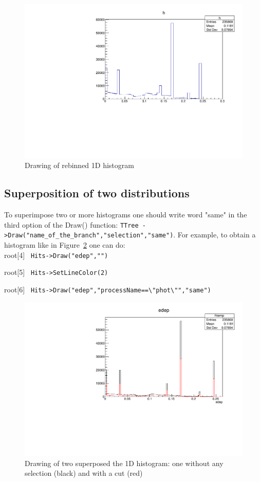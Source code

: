 \documentclass[12pt]{article}
\begin{document}
\begin{figure}[h]
\centering
\includegraphics[scale=0.5]{figs/1Drebinning.pdf}
\caption{Drawing of rebinned 1D histogram}
\label{fig:rebin}
\end{figure}

\clearpage
\subsection{Superposition of two distributions}
 To superimpose two or more histograms one should write word "same" in the third option of the Draw() function: \verb|TTree ->Draw("name_of_the_branch","selection","same")|. For example, to obtain a histogram like in Figure~\ref{fig:1Dhist_cut} one can do: \\

root[4] \verb| Hits->Draw("edep","") |

root[5] \verb| Hits->SetLineColor(2)|

root[6] \verb| Hits->Draw("edep","processName==\"phot\"","same") |\\

\begin{figure}[h]
\centering
\includegraphics[scale=0.5]{figs/1Dhist_cut.pdf}
\caption{Drawing of two superposed the 1D histogram: one without any selection (black) and with a cut (red)}
\label{fig:1Dhist_cut}
\end{figure}
\end{document}
